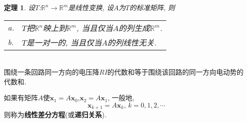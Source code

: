 \documentclass[UTF8,fontset=ubuntu]{ctexart}
\theoremstyle{nonumberplain}
\theoremstyle{break}
\newtheorem{theorem}{定理}
\theoremstyle{empty}
\begin{document}
\begin{theorem}
设$T$:$\mathbb{R}^n\rightarrow\mathbb{R}^m$是线性变换, 设$A$为$T$的标准矩阵, 则\\
\begin{tabular}{l@{\ }l}
a. & $T$把$\mathbb{R}^n$映上到$\mathbb{R}^m$, 当且仅当$A$的列生成$\mathbb{R}^m$.\\
b. & $T$是一对一的, 当且仅当$A$的列线性无关.
\end{tabular}
\end{theorem}
\begin{law}[基尔霍夫电压定律]\ \\
围绕一条回路同一方向的电压降$RI$的代数和等于围绕该回路的同一方向电动势的代数和.
\end{law}
\begin{law}
如果有矩阵$A$使$\bm{x}_1=A\bm{x}_0$,$\bm{x}_2=A\bm{x}_1$, 一般地,
\[\bm{x}_{k+1}=A\bm{x}_k\text{,\ }k=0,1,2,\cdots\]
则称为\textbf{线性差分方程}(或\textbf{递归关系}).
\end{law}
\end{document}
